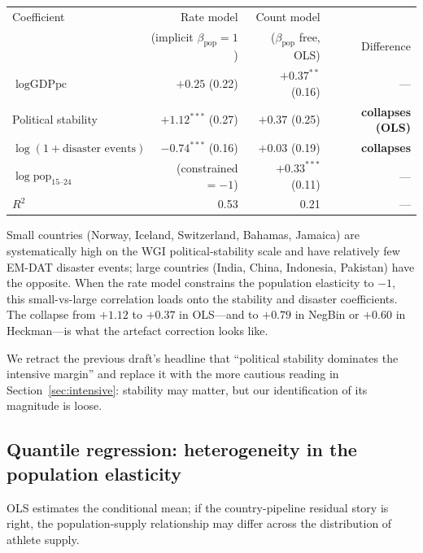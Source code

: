\documentclass[11pt]{article}
\begin{document}
\begin{center}
\small
\begin{tabular}{lrrr}
\toprule
Coefficient                                 & Rate model & Count model & \\
                                            & (implicit $\beta_{\text{pop}} = 1$) & ($\beta_{\text{pop}}$ free, OLS) & Difference \\
\midrule
$\log\text{GDPpc}$                          & $+0.25$  (0.22)                & $+0.37^{**}$ (0.16)           & --- \\
Political stability                         & $\mathbf{+1.12^{***}}$ (0.27)  & $+0.37$ (0.25)                & \textbf{collapses (OLS)} \\
$\log(1+\text{disaster events})$            & $\mathbf{-0.74^{***}}$ (0.16)  & $+0.03$ (0.19)                & \textbf{collapses} \\
$\log\text{pop}_{15\text{--}24}$            & (constrained $= -1$)           & $\mathbf{+0.33^{***}}$ (0.11) & --- \\
\midrule
$R^2$                                       & 0.53                           & 0.21                          & --- \\
\bottomrule
\end{tabular}
\end{center}

Small countries (Norway, Iceland, Switzerland, Bahamas, Jamaica) are
systematically high on the WGI political-stability scale and have
relatively few EM-DAT disaster events; large countries (India, China,
Indonesia, Pakistan) have the opposite. When the rate model
constrains the population elasticity to $-1$, this small-vs-large
correlation loads onto the stability and disaster coefficients. The
collapse from $+1.12$ to $+0.37$ in OLS---and to $+0.79$ in NegBin or
$+0.60$ in Heckman---is what the artefact correction looks like.

We retract the previous draft's headline that ``political stability
dominates the intensive margin'' and replace it with the more
cautious reading in Section~\ref{sec:intensive}: stability may
matter, but our identification of its magnitude is loose.

\subsection{Quantile regression: heterogeneity in the population
elasticity}
\label{sec:quantile}

OLS estimates the conditional mean; if the country-pipeline residual
story is right, the population-supply relationship may differ across
the distribution of athlete supply.
\end{document}
